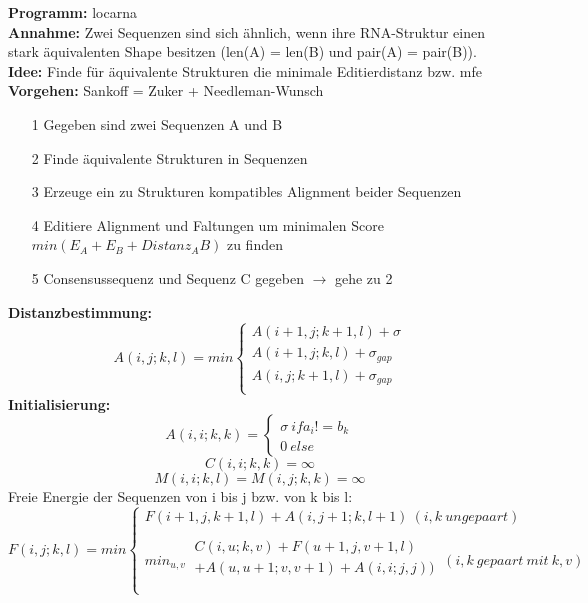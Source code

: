 \textbf{Programm:} locarna \\

\textbf{Annahme:} Zwei Sequenzen sind sich ähnlich, wenn ihre RNA-Struktur einen stark äquivalenten Shape besitzen (len(A) = len(B) und pair(A) = pair(B)).\\

\textbf{Idee:} Finde für äquivalente Strukturen die minimale Editierdistanz  bzw. mfe \\

\textbf{Vorgehen:} Sankoff = Zuker + Needleman-Wunsch
\begin{itemize}
\item[1] Gegeben sind zwei Sequenzen A und B
\item[2] Finde äquivalente Strukturen in Sequenzen
\item[3] Erzeuge ein zu Strukturen kompatibles Alignment beider Sequenzen
\item[4] Editiere Alignment und Faltungen um minimalen Score $min(E_A + E_B + Distanz_AB)$ zu finden
\item[5] Consensussequenz und Sequenz C gegeben $\rightarrow$ gehe zu 2
\end{itemize}
\textbf{Distanzbestimmung:}
\begin{equation}
A(i,j;k,l)= min \begin{cases} 
A(i+1,j;k+1,l) + \sigma \\
A(i+1,j;k,l) + \sigma_{gap} \\
A(i,j;k+1,l) + \sigma_{gap} \\
\end{cases}
\end{equation}
\textbf{Initialisierung:}
\begin{equation}
A(i,i;k,k) = \begin{cases} \sigma \ if a_i != b_k \\ 0 \ else\end{cases}
\end{equation}
\begin{equation}
C(i,i;k,k) = \infty
\end{equation}
\begin{equation}
M(i,i;k,l) = M(i,j;k,k) = \infty
\end{equation}
Freie Energie der Sequenzen von i bis j bzw. von k bis l:
\begin{equation}
F(i,j;k,l)= min \begin{cases}
F(i+1,j,k+1,l) + A(i,j+1;k,l+1) \ (i,k \ ungepaart) \\
\\
min_{u,v}\ 
\begin{split}
C(i,u;k,v) + F(u+1,j,v+1,l) \\
+ A(u,u+1;v,v+1) + A(i,i;j,j)) \\ 
\end{split}
\ (i,k \ gepaart \ mit \ k,v)\\
\end{cases}
\end{equation}
